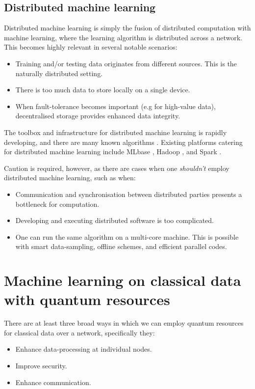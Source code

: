 \documentclass[twocolumn, aps, rmp, amsmath, amssymb, nofootinbib, superscriptaddress, longbibliography, floatfix, table-of-contents, eqsecnum]{revtex4}
\begin{document}
\subsection{Distributed machine learning}

Distributed machine learning is simply the fusion of distributed computation with machine learning, where the learning algorithm is distributed across a network. This becomes highly relevant in several notable scenarios:
\begin{itemize}
\item Training and/or testing data originates from different sources. This is the naturally distributed setting.
\item There is too much data to store locally on a single device.
\item When fault-tolerance becomes important (e.g for high-value data), decentralised storage provides enhanced data integrity.
\end{itemize}

The toolbox and infrastructure for distributed machine learning is rapidly developing, and there are many known algorithms \cite{bib:peteiro2013survey, bib:florian2013}. Existing platforms catering for distributed machine learning include MLbase \cite{bib:MLbase}, Hadoop \cite{bib:white2012hadoop}, and Spark \cite{bib:shanahan2015large}.

Caution is required, however, as there are cases when one \textit{shouldn't} employ distributed machine learning, such as when:
\begin{itemize}
\item Communication and synchronisation between distributed parties presents a bottleneck for computation.
\item Developing and executing distributed software is too complicated.
\item One can run the same algorithm on a multi-core machine. This is possible with smart data-sampling, offline schemes, and efficient parallel codes.
\end{itemize}

\section{Machine learning on classical data with quantum resources}

There are at least three broad ways in which we can employ quantum resources for classical data over a network, specifically they:
\begin{itemize}
\item Enhance data-processing at individual nodes.
\item Improve security.
\item Enhance communication.
\end{itemize}
\end{document}
